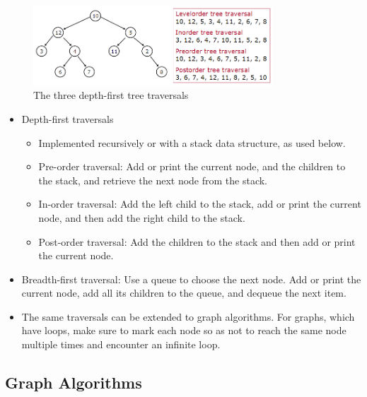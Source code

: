 \documentclass{article}
\begin{document}
\begin{figure}[h]
    \centering
    \includegraphics[width=0.8\textwidth]{images/TreeTraversals.png}
    \caption{The three depth-first tree traversals}
    \label{fig:my_label}
\end{figure}

\begin{itemize}
    \item Depth-first traversals
    \begin{itemize}
        \item Implemented recursively or with a stack data structure, as used below.
        \item Pre-order traversal: Add or print the current node, and the children to the stack, and retrieve the next node from the stack.
        \item In-order traversal: Add the left child to the stack, add or print the current node, and then add the right child to the stack.
        \item Post-order traversal: Add the children to the stack and then add or print the current node.
    \end{itemize}
    \item Breadth-first traversal: Use a queue to choose the next node. Add or print the current node, add all its children to the queue, and dequeue the next item.
    \item The same traversals can be extended to graph algorithms. For graphs, which have loops, make sure to mark each node so as not to reach the same node multiple times and encounter an infinite loop.
\end{itemize}

\subsection*{Graph Algorithms}
\end{document}
